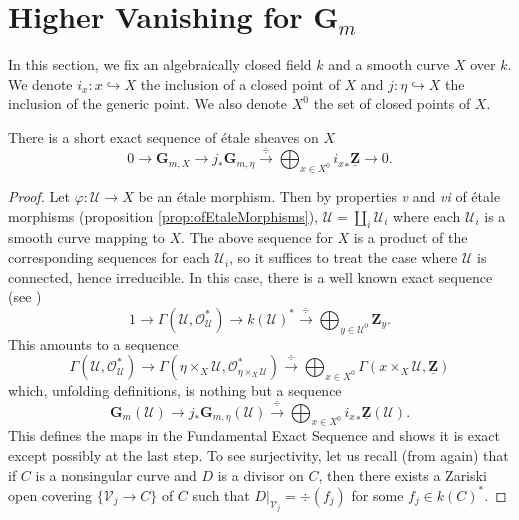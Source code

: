 \section{Higher Vanishing for $\mathbf{G}_m$}
\label{section-higher-Gm}

\noindent
In this section, we fix an algebraically closed field $k$ and a smooth curve 
$X$ over $k$. We denote $i_x : x \hookrightarrow X$ the inclusion of a closed 
point of $X$ and $j : \eta \hookrightarrow X$ the inclusion of the generic 
point. We also denote $X^0$ the set of closed points of $X$. 

\begin{theorem}
There is a short exact sequence of \'etale sheaves on $X$
$$
0 \longrightarrow \mathbf{G}_{m,X} \longrightarrow j_* \mathbf{G}_{m,\eta} 
\xrightarrow{\ \div\ } \bigoplus_{x \in X^0} {i_x}_* \underline{\mathbf{Z}} 
\longrightarrow 0.
$$
\end{theorem}

\begin{proof}
Let $\varphi : \mathcal{U} \to X$ be an \'etale morphism. Then by properties 
{\it v} and {\it vi} of \'etale morphisms (proposition 
\ref{prop:ofEtaleMorphisms}), $\mathcal{U} = \coprod_i \mathcal{U}_i$ where 
each $\mathcal{U}_i$ is a smooth curve mapping to $X$. The above sequence for 
$X$ is a product of the corresponding sequences for each $\mathcal{U}_i$, so it 
suffices to treat the case where $\mathcal{U}$ is connected, hence irreducible. 
In this case, there is a well known exact sequence (see \cite{H})
$$
1 \longrightarrow \Gamma(\mathcal{U},\mathcal{O}_\mathcal{U}^*) \longrightarrow 
k(\mathcal{U})^* \xrightarrow{\ \div\ } \bigoplus_{y \in \mathcal{U}^0} 
\mathbf{Z}_y.
$$
This amounts to a sequence
$$
\Gamma(\mathcal{U},\mathcal{O}_\mathcal{U}^*) \longrightarrow 
\Gamma(\eta\times_X\mathcal{U},\mathcal{O}_{\eta\times_X\mathcal{U}}^*) 
\xrightarrow{\ \div\ } \bigoplus_{x \in X^0} 
\Gamma(x\times_X\mathcal{U},\underline{\mathbf{Z}}) 
$$
which, unfolding definitions, is nothing but a sequence
$$
\mathbf{G}_m(\mathcal{U}) \longrightarrow j_* \mathbf{G}_{m,\eta}(\mathcal{U}) 
\xrightarrow{\ \div\ } \bigoplus_{x \in X^0} {i_x}_* \underline{\mathbf{Z}} 
(\mathcal{U}).
$$
This defines the maps in the Fundamental Exact Sequence and shows it is exact 
except possibly at the last step. To see surjectivity, let us recall (from 
\cite{H} again) that if $C$ is a nonsingular curve and $D$ is a divisor on $C$, 
then there exists a Zariski open covering $\{ \mathcal{V}_j \to C \}$ of $C$ 
such that $D |_{\mathcal{V}_j} = \div(f_j)$ for some $f_j \in k(C)^*$.
\end{proof}


